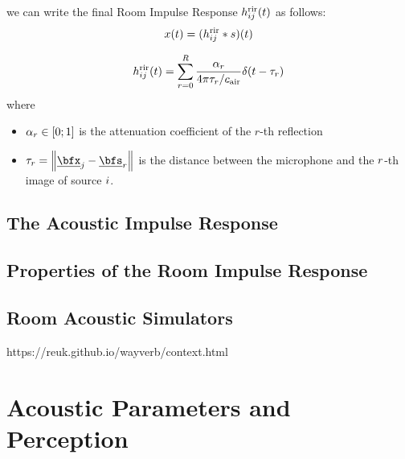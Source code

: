  we can write the final Room Impulse Response $h^{\text{rir}}_{ij}(t)$ as follows:
\begin{equation}
    x(t) = (h^{\text{rir}}_{ij} \ast s)(t)
\end{equation}

\begin{equation}
    \rir_{ij}(t) = \sum_{r=0}^{R} \frac{\alpha_r}{4 \pi \tau_r / \cair} \delta \kparen{t - \tau_r}
\end{equation}
where
\begin{itemize}
    \item $\alpha_r \in \kintervcc{0}{1}$ is the attenuation coefficient of the $r$-th reflection
    \item $\tau_r = \norm{\positionMicrophone_\idxMic - \positionSource_\idxEch}$ is the distance between the microphone and the $r$-th image of source $i$.
\end{itemize}



\subsection{The Acoustic Impulse Response}

\subsection{Properties of the Room Impulse Response}

\subsection{Room Acoustic Simulators}
https://reuk.github.io/wayverb/context.html

\section{Acoustic Parameters and Perception}
